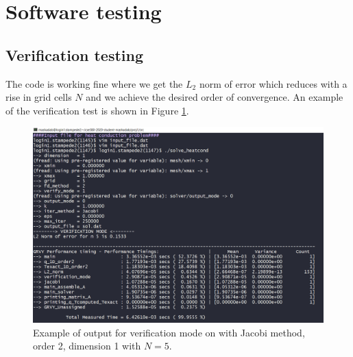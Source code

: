 \documentclass[12pt]{amsart}   %
\begin{document}
\section{Software testing}
\subsection{Verification testing}
The code is working fine where we get the $L_2$ norm of error which reduces with a rise in grid cells $N$ and we achieve the desired order of convergence. An example of the verification test is shown in Figure \ref{fig:6}.

\begin{figure}[htbp!]
\centering
    \includegraphics[width=1.3\linewidth]{Project1photos/verification.png}
    \caption{Example of output for verification mode on with Jacobi method, order 2, dimension 1 with $N=5$.}
    \label{fig:6}
\end{figure}
\end{document}
